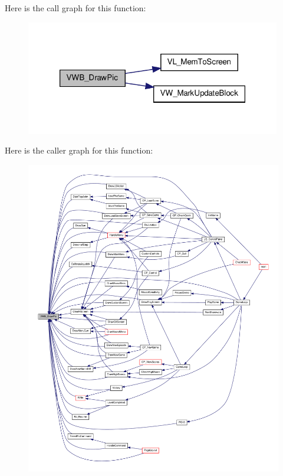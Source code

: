 Here is the call graph for this function:
\nopagebreak
\begin{figure}[H]
\begin{center}
\leavevmode
\includegraphics[width=316pt]{ID__VH_8C_a997467dad7e57de584aa100eb9a8c882_cgraph}
\end{center}
\end{figure}




Here is the caller graph for this function:
\nopagebreak
\begin{figure}[H]
\begin{center}
\leavevmode
\includegraphics[width=400pt]{ID__VH_8C_a997467dad7e57de584aa100eb9a8c882_icgraph}
\end{center}
\end{figure}


